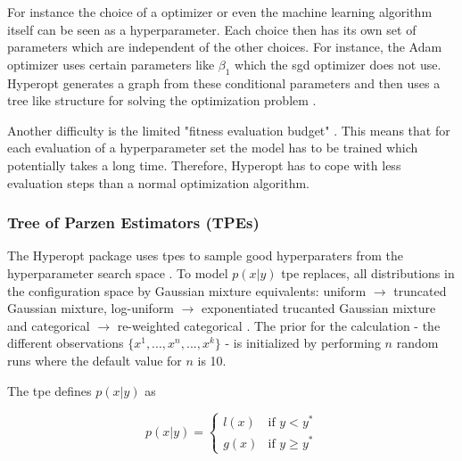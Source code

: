 For instance the choice of a optimizer or even the machine learning algorithm itself can be seen as a hyperparameter. Each choice then has its own set of parameters which are independent of the other choices. For instance, the Adam optimizer uses certain parameters like $\beta_1$ which the \gls{sgd} optimizer does not use. Hyperopt generates a graph from these conditional parameters and then uses a tree like structure for solving the optimization problem \cite{Bergstra2011}.
\newline

Another difficulty is the limited "fitness evaluation budget" \cite{Bergstra2011}. This means that for each evaluation of a hyperparameter set the model has to be trained which potentially takes a long time. Therefore, Hyperopt has to cope with less evaluation steps than a normal optimization algorithm.

\subsubsection*{Tree of Parzen Estimators {(TPEs)}}
The Hyperopt package uses \glspl{tpe} to sample good hyperparaters from the hyperparameter search space \cite{Bergstra2013a}. To model $p(x|y)$ \gls{tpe} replaces, all distributions in the configuration space by Gaussian mixture equivalents: uniform $\rightarrow$ truncated Gaussian mixture, log-uniform $\rightarrow$ exponentiated trucanted Gaussian mixture and categorical $\rightarrow$ re-weighted categorical \cite{Bergstra2013a}. The prior for the calculation - the different observations $\{x^1,..., x^n, ..., x^k\}$ - is initialized by performing $n$ random runs where the default value for $n$ is 10.

The \gls{tpe} defines $p(x|y)$ as 

\begin{equation}
p(x|y) =
\begin{cases}

l(x) & \text{if } y < y^* \\
g(x) & \text{if } y \geq y^*

\end{cases}
\end{equation}

